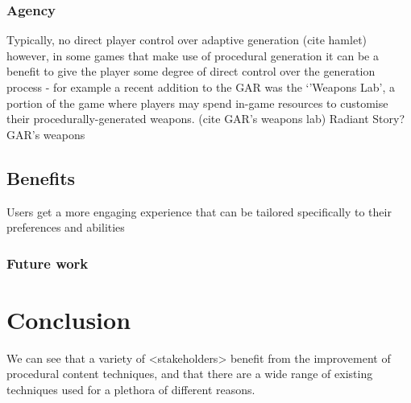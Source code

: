 \documentclass{./acm_proc_article-sp}
\begin{document}
\subsubsection{Agency}
Typically, no direct player control over adaptive generation (cite hamlet)
however, in some games that make use of procedural generation it can be a benefit to give the player some degree of direct control over the generation process - for example a recent addition to the GAR was the `'Weapons Lab', a portion of the game where players may spend in-game resources to customise their procedurally-generated weapons. (cite GAR's weapons lab)
Radiant Story?
GAR's weapons

\subsection{Benefits}
Users get a more engaging experience that can be tailored specifically to their preferences and abilities
\subsubsection{Future work}

\section{Conclusion}
We can see that a variety of <stakeholders> benefit from the improvement of procedural content techniques, and that there are a wide range of existing techniques used for a plethora of different reasons.

\end{document}
